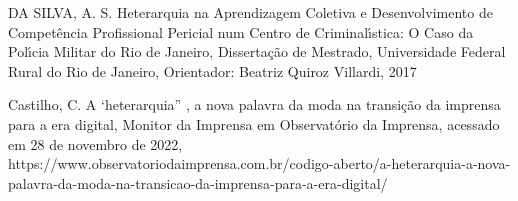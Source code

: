 \documentclass[
12pt,		%
openright,	%
twoside,  %
a4paper,			%
chapter=TITLE,		%
english,			%
french,				%
spanish,			%
brazil				%
]{USPSC-classe/USPSC}
\begin{document}
\begin{flushleft}
\begin{flushleft}
\begin{flushleft}
\begin{flushleft}
\begin{flushleft}
\begin{flushleft}
\begin{flushleft}
\begin{flushleft}
[DA SILVA, 2017] DA SILVA, A. S. Heterarquia na Aprendizagem Coletiva e Desenvolvimento de Compet\^encia
Profissional Pericial num Centro de Criminal\'{\i}stica:
O Caso da Pol\'{\i}cia Militar do Rio de Janeiro, Disserta\c{c}\~ao de Mestrado, Universidade Federal Rural do Rio de Janeiro, Orientador: Beatriz Quiroz Villardi, 2017
\end{flushleft}


\end{flushleft}


\end{flushleft}


\end{flushleft}


\end{flushleft}


\end{flushleft}


\end{flushleft}


\end{flushleft}


\begin{flushleft}
\begin{flushleft}
\begin{flushleft}
\begin{flushleft}
\begin{flushleft}
\begin{flushleft}
\begin{flushleft}
\begin{flushleft}
[CASTILHO, 2008] Castilho, C. A ‘heterarquia” , a nova palavra da moda na transi\c{c}\~ao da imprensa para a era digital, Monitor da Imprensa em Observat\'orio da Imprensa, acessado em 28 de novembro de 2022, https://www.observatoriodaimprensa.com.br/codigo-aberto/a-heterarquia-a-nova-palavra-da-moda-na-transicao-da-imprensa-para-a-era-digital/
\end{flushleft}


\end{flushleft}


\end{flushleft}


\end{flushleft}


\end{flushleft}


\end{flushleft}


\end{flushleft}


\end{flushleft}
\end{document}
